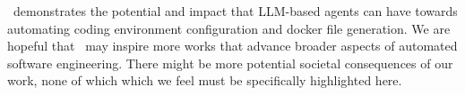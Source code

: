 \tool~demonstrates the potential and impact that LLM-based agents can have towards automating coding environment configuration and docker file generation.
We are hopeful that \tool~may inspire more works that advance broader aspects of automated software engineering.
There might be more potential societal consequences of our work, none of which which we feel must be specifically highlighted here.